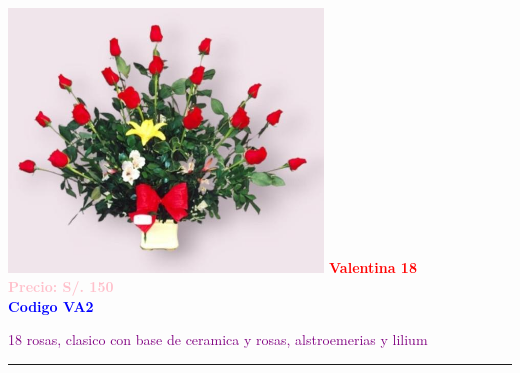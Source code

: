 \begin{multicols}{2}
    \begin{minipage}{\linewidth}
        \centering
        \includegraphics[height=7cm]{imagenes_extraidas/image_10_4} %
        \newline
        \vspace{0.1cm}
        \textbf{\Large \textcolor{red}{Valentina 18}} \\ %
        \vspace{0.2cm}
        \textbf{\textcolor{pink}{Precio: S/. 150}} \\ %
        \vspace{0.2cm}
        \textbf{\textcolor{blue}{Codigo VA2}} \\ %
        \vspace{0.2cm}
        \begin{minipage}{0.8\linewidth} 
            \small \textcolor{purple}{18 rosas, clasico con base de ceramica y rosas, alstroemerias y lilium} %
        \end{minipage}
        \vspace{0.1cm}        
        \rule{\linewidth}{0.5pt}
    \end{minipage}
    

\end{multicols}
